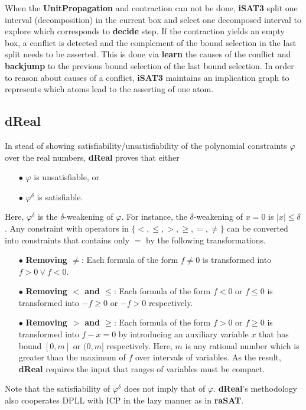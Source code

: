 \documentclass[runningheads,a4paper,oribibl]{llncs}
\begin{document}
When the \textbf{UnitPropagation} and contraction can not be done, \textbf{iSAT3} split one interval (decomposition) in the current box and select one decomposed interval to explore which corresponds to \textbf{decide} step. If the contraction yields an empty box, a conflict is detected and the complement of the bound selection in the last split needs to be asserted. This is done via \textbf{learn} the causes of the conflict and \textbf{backjump} to the previous bound selection of the last bound selection. In order to reason about causes of a conflict, \textbf{iSAT3} maintains an implication graph to represents which atoms lead to the asserting of one atom. 
\subsection*{dReal}
In stead of showing satisfiability/unsatisfiability of the polynomial constraints $\varphi$ over the real numbers, \textbf{dReal} proves that either
\begin{itemize}
\item [$\bullet$] $\varphi$ is unsatisfiable, or 
\item [$\bullet$] $\varphi^\delta$ is satisfiable. 
\end{itemize}
Here, $\varphi^\delta$ is the $\delta$-weakening of $\varphi$. For instance, the $\delta$-weakening of $x = 0$ is $|x| \le \delta$. Any constraint with operators in $\{<, \le, > , \ge, =, \not=\}$ can be converted into constraints that contains only $=$ by the following transformations.
\begin{itemize}
\item [$\bullet$] \textbf{Removing $\not=$}: Each formula of the form $f \not= 0$ is transformed into $f > 0 \vee f < 0$.
\item [$\bullet$] \textbf{Removing $<$ and $\le$}: Each formula of the form $f < 0$ or $f \le 0$ is transformed into $-f \ge 0$ or $-f > 0$ respectively.
\item [$\bullet$] \textbf{Removing $>$ and $\ge$}: Each formula of the form $f > 0$ or $f \ge 0$ is transformed into $f - x = 0$ by introducing an auxiliary variable $x$ that has bound $[0, m]$ or $(0, m]$ respectively. Here, $m$ is any rational number which is greater than the maximum of $f$ over intervals of variables. As the result, \textbf{dReal} requires the input that ranges of variables must be compact.
\end{itemize}

Note that the satisfiability of $\varphi^\delta$ does not imply that of $\varphi$. \textbf{dReal}'s methodology~\cite{Gao:2012:9DP:2352896.2352921} also cooperates DPLL with ICP in the lazy manner as in \textbf{raSAT}.
\end{document}
